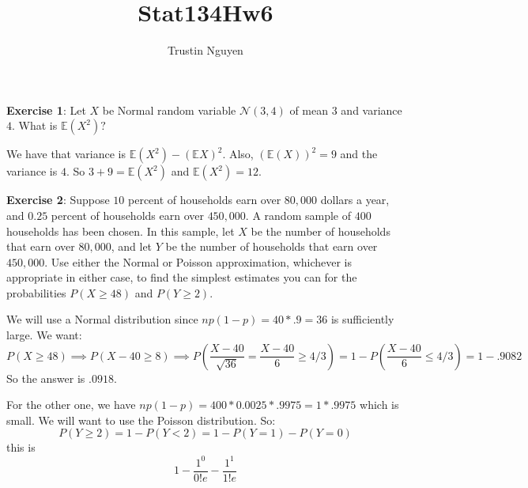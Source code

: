 \documentclass{article}
\title{Stat134Hw6}
\author{Trustin Nguyen}
\begin{document}
    \maketitle

\reversemarginpar

\textbf{Exercise 1}: Let $X$ be Normal random variable $\mathcal{N}(3, 4)$ of mean $3$ and variance $4$. What is $\mathbb{E}(X^{2})?$
    \begin{answer}
        We have that variance is $\mathbb{E}(X^{2}) - (\mathbb{E}X)^{2}$. Also, $(\mathbb{E}(X))^{2} = 9$ and the variance is $4$. So $3 + 9 = \mathbb{E}(X^{2})$ and $\mathbb{E}(X^{2}) = 12$.
    \end{answer}

\textbf{Exercise 2}: Suppose $10$ percent of households earn over $80,000$ dollars a year, and $0.25$ percent of households earn over $450,000$. A random sample of $400$ households has been chosen. In this sample, let $X$ be the number of households that earn over $80, 000$, and let $Y$ be the number of households that earn over $450,000$. Use either the Normal or Poisson approximation, whichever is appropriate in either case, to find the simplest estimates you can for the probabilities $P(X \geq 48)$ and $P(Y \geq 2)$.
    \begin{answer}
        We will use a Normal distribution since $np(1 - p) = 40 * .9 = 36$ is sufficiently large. We want:
            \begin{equation*}
                P(X \geq 48) \implies P(X - 40 \geq 8) \implies P(\dfrac{X - 40}{\sqrt{36}} = \dfrac{X - 40}{6} \geq 4/3) = 1 - P(\dfrac{X - 40}{6} \leq 4/3) = 1 - .9082
            \end{equation*}
        So the answer is $.0918$.

        For the other one, we have $np(1 - p) = 400 * 0.0025 * .9975 = 1 * .9975$ which is small. We will want to use the Poisson distribution. So:
            \begin{equation*}
                P(Y \geq 2) = 1 - P(Y < 2) = 1 - P(Y = 1) - P(Y = 0)
            \end{equation*}
        this is 
            \begin{equation*}
                1 - \dfrac{1^{0}}{0!e} - \dfrac{1^{1}}{1!e}
            \end{equation*}
    \end{answer}
\end{document}
